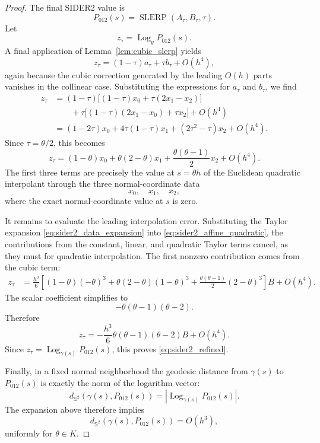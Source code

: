 \documentclass[a4paper,11pt]{article}
\newcommand{\bS}{\mathbb{S}}
\newcommand{\Log}{\operatorname{Log}}
\newcommand{\SLERP}{\operatorname{SLERP}}
\numberwithin{equation}{section}
\begin{document}
\begin{proof}
The final SIDER2 value is
\[
        P_{012}(s)=\SLERP(A_\tau,B_\tau,\tau).
\]
Let
\[
        z_\tau=\Log_y P_{012}(s).
\]
A final application of Lemma~\ref{lem:cubic_slerp} yields
\[
        z_\tau
        =
        (1-\tau)a_\tau+\tau b_\tau+O(h^4),
\]
again because the cubic correction generated by the leading \(O(h)\) parts
vanishes in the collinear case.  Substituting the expressions for \(a_\tau\)
and \(b_\tau\), we find
\begin{align*}
        z_\tau
        &=
        (1-\tau)\bigl[(1-\tau)x_0+\tau(2x_1-x_2)\bigr]  \\
        &\qquad
        +\tau\bigl[(1-\tau)(2x_1-x_0)+\tau x_2\bigr]
        +O(h^4)                                                   \\
        &=
        (1-2\tau)x_0
        +
        4\tau(1-\tau)x_1
        +
        (2\tau^2-\tau)x_2
        +O(h^4).
\end{align*}
Since \(\tau=\theta/2\), this becomes
\begin{equation}
\label{eq:sider2_affine_quadratic}
        z_\tau
        =
        (1-\theta)x_0
        +
        \theta(2-\theta)x_1
        +
        \frac{\theta(\theta-1)}{2}x_2
        +O(h^4).
\end{equation}
The first three terms are precisely the value at \(s=\theta h\) of the
Euclidean quadratic interpolant through the three normal-coordinate data
\[
        x_0,\quad x_1,\quad x_2,
\]
where the exact normal-coordinate value at \(s\) is zero.

It remains to evaluate the leading interpolation error.  Substituting the
Taylor expansion \eqref{eq:sider2_data_expansion} into
\eqref{eq:sider2_affine_quadratic}, the contributions from the constant,
linear, and quadratic Taylor terms cancel, as they must for quadratic
interpolation.  The first nonzero contribution comes from the cubic term:
\[
\begin{aligned}
        z_\tau
        &=
        \frac{h^3}{6}
        \left[
        (1-\theta)(-\theta)^3
        +
        \theta(2-\theta)(1-\theta)^3
        +
        \frac{\theta(\theta-1)}{2}(2-\theta)^3
        \right]B
        +O(h^4).
\end{aligned}
\]
The scalar coefficient simplifies to
\[
        -\theta(\theta-1)(\theta-2).
\]
Therefore
\[
        z_\tau
        =
        -\frac{h^3}{6}
        \theta(\theta-1)(\theta-2)B
        +O(h^4).
\]
Since \(z_\tau=\Log_{\gamma(s)}P_{012}(s)\), this proves
\eqref{eq:sider2_refined}.

Finally, in a fixed normal neighborhood the geodesic distance from
\(\gamma(s)\) to \(P_{012}(s)\) is exactly the norm of the logarithm vector:
\[
        d_{\bS^2}(\gamma(s),P_{012}(s))
        =
        \left|\Log_{\gamma(s)}P_{012}(s)\right|.
\]
The expansion above therefore implies
\[
        d_{\bS^2}(\gamma(s),P_{012}(s))=O(h^3),
\]
uniformly for \(\theta\in K\).
\end{proof}
\end{document}

